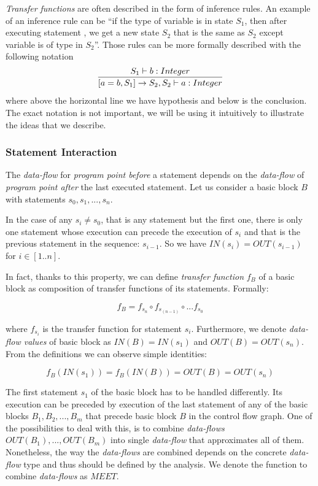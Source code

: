        \emph{Transfer functions} are often described in the form of inference rules. 
        An example of an inference rule can be 
        ``if the type of variable  is  in state $S_1$, 
        then after executing statement , we get a new state $S_2$ that 
        is the same as $S_2$ except variable  is of type  in $S_2$''. 
        Those rules can be more formally described with the following notation        
        $$
        \infer{[a=b, S_1] \rightarrow S_2, S_2 \vdash a : Integer}{S_1 \vdash b : Integer}
        $$        
        where above the horizontal line we have hypothesis and below is 
        the conclusion. The exact notation is not important, we will be using it 
        intuitively to illustrate the ideas that we describe.
        
        \subsubsection*{Statement Interaction}
        
        The \emph{data-flow} for \emph{program point before} a statement 
        depends on the \emph{data-flow} of \emph{program point after} the 
        last executed statement. Let us consider a basic block $B$ with 
        statements $s_0, s_1, ..., s_n$.
        
        In the case of any $s_i \neq s_0$, that is any statement but 
        the first one, there is only one statement whose execution 
        can precede the execution of $s_i$ and that is the previous statement 
        in the sequence: $s_{i-1}$. So we have $IN(s_i) = OUT(s_{i-1})$ 
        for $i\in{[1..n]}$. 
        
        In fact, thanks to this property, we can define \emph{transfer function} 
        $f_B$ of a basic block as composition of transfer functions of 
        its statements. Formally: 
        
        \[ f_B = f_{s_n} \circ f_{s_{(n-1)}} \circ ... f_{s_0} \]
        
        where $f_{s_i}$ is the transfer function for statement $s_i$.            
        Furthermore, we denote \emph{data-flow values} of basic block as 
        $IN(B)=IN(s_1)$ and $OUT(B)=OUT(s_n)$. From the definitions we can 
        observe simple identities: 
        
        \[ f_B(IN(s_1))=f_B(IN(B))=OUT(B)=OUT(s_n) \]
        
        The first statement $s_1$ of the basic block has to be 
        handled differently. Its execution can be preceded by 
        execution of the last statement of any of 
        the basic blocks $B_1, B_2, ..., B_m$ that precede basic block 
        $B$ in the control flow graph. One of the possibilities to deal with 
        this, is to combine \emph{data-flows} $OUT(B_1), ..., OUT(B_m)$ into 
        single \emph{data-flow} that approximates all of them. 
        Nonetheless, the way the \emph{data-flows} are combined depends 
        on the concrete \emph{data-flow} type and thus 
        should be defined by the analysis. We denote the function to 
        combine \emph{data-flows} as $\mathit{MEET}$. 
        
